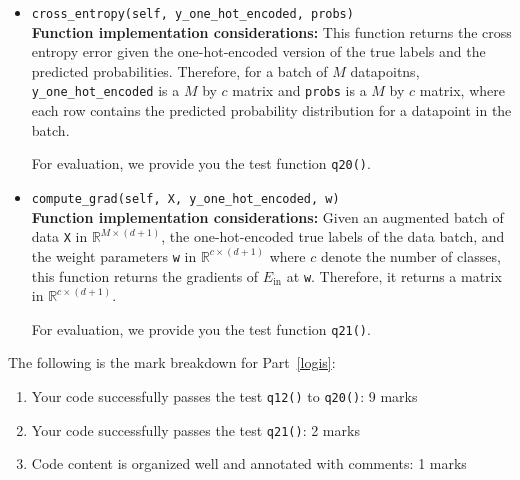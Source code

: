 \documentclass{article}
\theoremstyle{definition}
\begin{document}
\begin{itemize}
{				For evaluation, we provide you the test function \verb|q19()|.}
			\item{\verb|cross_entropy(self, y_one_hot_encoded, probs)|\\\textbf{Function implementation considerations:}
				This function returns the cross entropy error given the one-hot-encoded version of the true labels and the predicted probabilities. Therefore, for a batch of $M$ datapoitns, \verb|y_one_hot_encoded| is a $M$ by $c$ matrix and \verb|probs| is a $M$ by $c$ matrix, where each row contains the predicted probability distribution for a datapoint in the batch.
				
				For evaluation, we provide you the test function \verb|q20()|.}
			\item{\verb|compute_grad(self, X, y_one_hot_encoded, w)|\\\textbf{Function implementation considerations:}
				Given an augmented batch of data \verb|X| in $\mathbb{R}^{M\times (d+1)}$, the one-hot-encoded true labels of the data batch, and the weight parameters \verb|w| in $\mathbb{R}^{c \times (d+1)}$ where $c$ denote the number of classes, this function returns the gradients of $E_{\text{in}}$ at \verb|w|. Therefore, it returns a matrix in  $\mathbb{R}^{c \times (d+1)}$.
				
				For evaluation, we provide you the test function \verb|q21()|.}
\end{itemize}
The following is the mark breakdown for Part~\ref{logis}:
\begin{enumerate}[label=(\roman*)]
	\item Your code successfully passes the test \verb|q12()| to \verb|q20()|: 9 marks
	\item Your code successfully passes the test \verb|q21()|: 2 marks
	\item Code content is organized well and annotated with comments: 1 marks
\end{enumerate}
\end{document}
